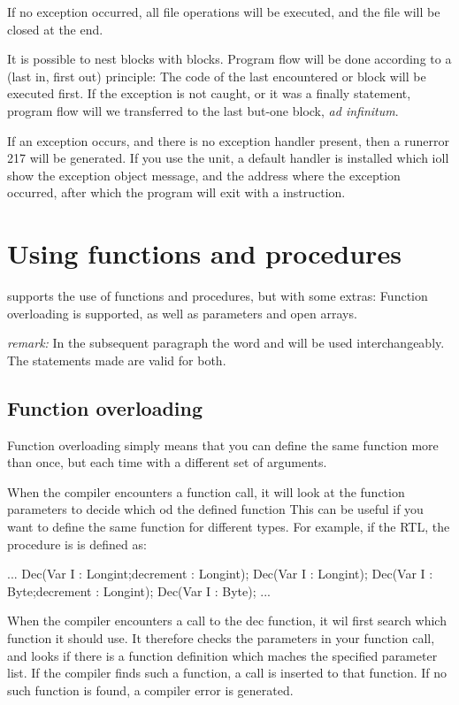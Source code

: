 \documentclass{report}
\begin{document}
If no exception occurred, all file operations will be executed, and the file
will be closed at the end.

It is possible to nest  blocks with 
blocks. Program flow will be done according to a  (last in, first
out) principle: The code of the last encountered  or
  block will be executed first. If the exception is not
caught, or it was a finally statement, program flow will we transferred to
the last but-one block, {\em ad infinitum}.

If an exception occurs, and there is no exception handler present, then a
runerror 217 will be generated. If you use the  unit, a default
handler is installed which ioll show the exception object message, and the
address where the exception occurred, after which the program will exit with
a  instruction.

\section{Using functions and procedures}
\fpc supports the use of functions and procedures, but with some extras:
Function overloading is supported, as well as  parameters and
open arrays.

{\em remark:} In the subsequent paragraph the word  and
 will be used interchangeably. The statements made are
valid for both.

\subsection{Function overloading}
Function overloading simply means that you can define the same function more
than once, but each time with a different set of arguments.

When the compiler encounters a function call, it will look at the function
parameters to decide which od the defined function
This can be useful if you want to define the same function for different
types. For example, if the RTL, the   procedure is
is defined as:
\begin{listing}
...
Dec(Var I : Longint;decrement : Longint);
Dec(Var I : Longint);
Dec(Var I : Byte;decrement : Longint);
Dec(Var I : Byte);
...
\end{listing}
When the compiler encounters a call to the dec function, it wil first search
which function it should use. It therefore checks the parameters in your
function call, and looks if there is a function definition which maches the
specified parameter list. If the compiler finds such a function, a call is
inserted to that function. If no such function is found, a compiler error is
generated.
\end{document}

